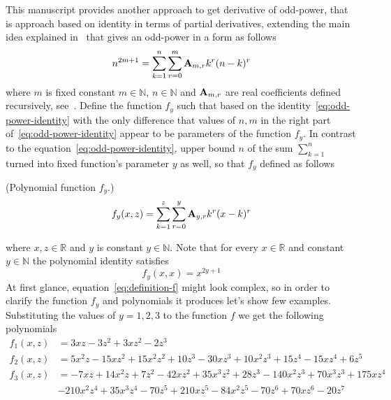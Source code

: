 This manuscript provides another approach to get derivative of odd-power, that is approach based
on identity in terms of partial derivatives, extending the main idea explained in~\cite{kolosov_2022}
that gives an odd-power in a form as follows
\begin{equation}
    n^{2m+1} = \sum_{k=1}^{n} \sum_{r=0}^{m} {\mathbf{A}} \sb{m,r} k^r (n-k)^r
    \label{eq:odd-power-identity}
\end{equation}
where $m$ is fixed constant $m\in\mathbb{N}$, $n \in \mathbb{N}$ and ${\mathbf{A}} \sb{m,r}$ are real coefficients defined
recursively, see~\cite{kolosov2016link}.
Define the function $f_{y}$ such that based on the identity~\eqref{eq:odd-power-identity} with the only difference that
values of $n, m$ in the right part of~\eqref{eq:odd-power-identity} appear to be parameters of the function $f_{y}$.
In contrast to the equation~\eqref{eq:odd-power-identity}, upper bound $n$ of the sum $\sum_{k=1}^{n}$ turned into fixed
function's parameter $y$ as well, so that $f_{y}$ defined as follows
\begin{definition} (Polynomial function $f_{y}$.)
    \begin{equation}
        f_{y} (x, z) = \sum_{k=1}^{z} \sum_{r=0}^{y} {\mathbf{A}} \sb{y,r} k^r (x-k)^r
        \label{eq:definition-f}
    \end{equation}
\end{definition}
where $x, z\in \mathbb{R}$ and $y$ is constant $y \in \mathbb{N}$.
Note that for every $x\in\mathbb{R}$ and constant $y\in\mathbb{N}$ the polynomial identity satisfies
\begin{equation*}
    f_{y} (x, x) = x^{2y+1}
\end{equation*}
At first glance, equation~\eqref{eq:definition-f} might look complex, so in order to clarify
the function $f_y$ and polynomials it produces let's show few examples.
Substituting the values of $y=1,2,3$ to the function $f$ we get the following polynomials
\begin{align*}
    f_{1} (x, z) &= 3 x z - 3 z^2 + 3 x z^2 - 2 z^3 \\
    f_{2} (x, z) &= 5 x^2 z - 15 x z^2 + 15 x^2 z^2 + 10 z^3 - 30 x z^3 + 10 x^2 z^3 +
    15 z^4 - 15 x z^4 + 6 z^5 \\
    f_{3} (x, z) &= -7 x z + 14 x^2 z + 7 z^2 - 42 x z^2 + 35 x^3 z^2 + 28 z^3 - 140 x^2 z^3 + 70 x^3 z^3 + 175 x z^4 \\
    &- 210 x^2 z^4 + 35 x^3 z^4 - 70 z^5 + 210 x z^5 - 84 x^2 z^5 - 70 z^6 + 70 x z^6 - 20 z^7
\end{align*}
